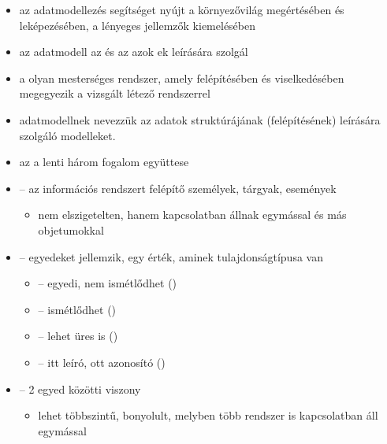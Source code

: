 \documentclass[main.tex]{subfiles}
\begin{document}
  \begin{itemize}
    \item az adatmodellezés segítséget nyújt a
    környezővilág megértésében és leképezésében,
    a lényeges jellemzők kiemelésében

    \item az adatmodell az  és az
    azok ek leírására szolgál

    \item a  olyan mesterséges rendszer,
    amely felépítésében és viselkedésében megegyezik
    a vizsgált létező rendszerrel

    \item adatmodellnek nevezzük az adatok struktúrájának
    (felépítésének) leírására szolgáló modelleket.
  \end{itemize}

  \begin{itemize}
    \item az  a lenti három fogalom együttese
    
    \item {} – az információs rendszert
    felépítő személyek, tárgyak, események 
    \begin{itemize}
      \item nem elszigetelten, hanem kapcsolatban állnak
      egymással és más objetumokkal
    \end{itemize}
    
    \item {} – egyedeket jellemzik,
    egy érték, aminek tulajdonságtípusa van
    \begin{itemize}
      \item {}
      \tabto{6.5cm} – \tabto{7.5cm}
      egyedi, nem ismétlődhet ()
      
      \item {}
      \tabto{6.5cm} – \tabto{7.5cm}
      ismétlődhet ()

      \item {}
      \tabto{6.5cm} – \tabto{7.5cm}
      lehet üres is ()

      \item {}
      \tabto{6.5cm} – \tabto{7.5cm}
      itt leíró, ott azonosító ()
    \end{itemize}

    \item {} – 2 egyed közötti viszony
    \begin{itemize}
      \item lehet többszintű, bonyolult, melyben
      több rendszer is kapcsolatban áll egymással
    \end{itemize}
  \end{itemize}
\end{document}
